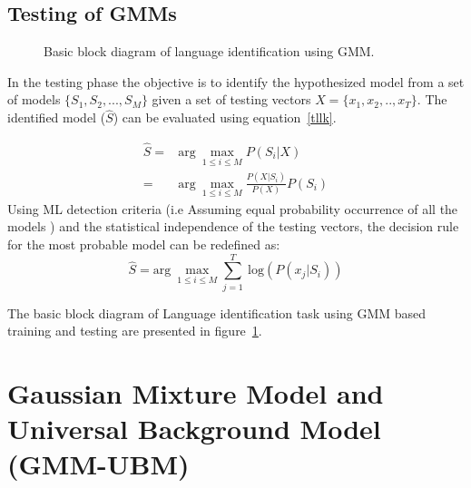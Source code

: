 \begin{spacing}{1.5}
 \subsection{Testing of GMMs}
\begin{figure}[h]
\caption{Basic block diagram of language identification using GMM.}
\label{gmm}
\end{figure} 

 In the testing phase the objective is to identify the hypothesized model from a set of models $\{S_{1}, S_{2},...,S_{M}\}$ given a set of testing vectors $X=\{x_{1}, x_{2},.., x_{T}\}$. The identified model ($\hat{S}$) can be evaluated using equation~\ref{tllk}. 

\begin{equation} 
\begin{aligned}
\label{tllk}
\hat{S} =&\mbox{arg}~\max_{1 \leq i \leq M} P(S_{i}|X)\\
        =&\mbox{arg}~\max_{1 \leq i \leq M} \frac{P(X|S_{i})}{P(X)}P(S_{i})
\end{aligned}
\end{equation}
 Using ML detection criteria (i.e Assuming equal probability occurrence of all the models )  and the statistical independence of the testing vectors, the decision rule for the most probable model can be redefined as:
 \begin{equation}
  \hat{S}=\mbox{arg}~\max_{1 \leq i \leq M}\sum_{j=1}^{T}~\mbox{log}(P(x_{j}|S_{i}))
 \end{equation} 

The basic block diagram of Language identification task using GMM based training and testing are presented in figure~\ref{gmm}. 

\section{Gaussian Mixture Model and Universal Background Model (GMM-UBM)}
\label{cgmmubm}


\end{spacing}
